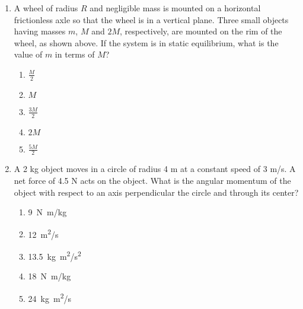 \documentclass[11pt]{article}
\begin{document}
\begin{multicols}{2}
\begin{enumerate}[leftmargin=18pt,resume]
    \begin{center}
    \end{center}
  \item A wheel of radius $R$ and negligible mass is mounted on a horizontal
    frictionless axle so that the wheel is in a vertical plane. Three small
    objects having masses $m$, $M$ and $2M$, respectively, are mounted on the
    rim of the wheel, as shown above. If the system is in static equilibrium,
    what is the value of $m$ in terms of $M$?
    \begin{enumerate}[nosep,leftmargin=18pt,label=(\Alph*)]
    \item$\displaystyle\frac{M}{2}$
    \item$M$
    \item$\displaystyle\frac{3M}{2}$
    \item$2M$
    \item$\displaystyle\frac{5M}{2}$
    \end{enumerate}
    \columnbreak
    
  \item A 2 kg object moves in a circle of radius 4 m at a constant speed of
    3 m/s. A net force of 4.5 N acts on the object. What is the angular
    momentum of the object with respect to an axis perpendicular the circle
    and through its center?
    \begin{enumerate}[nosep,leftmargin=18pt,label=(\Alph*)]
    \item\SI{9}{N.m/kg}
    \item\SI{12}{m^2/s}
    \item\SI{13.5}{kg.m^2/s^2}
    \item\SI{18}{N.m/kg}
    \item\SI{24}{kg.m^2/s}
    \end{enumerate}
    \vspace{.7in}
    

\end{enumerate}
\end{multicols}
\end{document}
